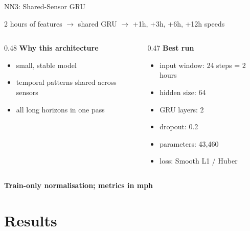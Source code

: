 \documentclass[aspectratio=169]{beamer}
\begin{document}
\begin{frame}{NN3: Shared-Sensor GRU}
\small
\begin{center}
\large
2 hours of features $\rightarrow$ shared GRU $\rightarrow$ +1h, +3h, +6h, +12h speeds
\end{center}

\vspace{0.4em}
\begin{columns}[T,totalwidth=\textwidth]
\begin{column}{0.48\textwidth}
\textbf{Why this architecture}
\begin{itemize}
  \item small, stable model
  \item temporal patterns shared across sensors
  \item all long horizons in one pass
\end{itemize}
\end{column}
\begin{column}{0.47\textwidth}
\textbf{Best run}
\begin{itemize}
  \item input window: 24 steps = 2 hours
  \item hidden size: 64
  \item GRU layers: 2
  \item dropout: 0.2
  \item parameters: 43,460
  \item loss: Smooth L1 / Huber
\end{itemize}
\end{column}
\end{columns}

\vspace{0.6em}
\centering
\textbf{Train-only normalisation; metrics in mph}
\end{frame}

\section{Results}
\end{document}
